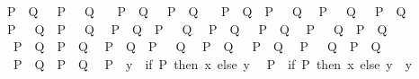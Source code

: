 \begin{isabellebody}
\ \ {\isachardoublequoteopen}P\ {\isacharequal}{\kern0pt}\ Q\ {\isasymor}\ {\isasymnot}\ P\ {\isasymor}\ {\isasymnot}\ Q{\isachardoublequoteclose}\isanewline
\ \ {\isachardoublequoteopen}{\isacharparenleft}{\kern0pt}{\isasymnot}\ P{\isacharparenright}{\kern0pt}\ {\isacharequal}{\kern0pt}\ Q\ {\isasymor}\ {\isasymnot}\ P\ {\isasymor}\ Q{\isachardoublequoteclose}\isanewline
\ \ {\isachardoublequoteopen}{\isacharparenleft}{\kern0pt}{\isasymnot}\ P{\isacharparenright}{\kern0pt}\ {\isacharequal}{\kern0pt}\ Q\ {\isasymor}\ P\ {\isasymor}\ {\isasymnot}\ Q{\isachardoublequoteclose}\isanewline
\ \ {\isachardoublequoteopen}P\ {\isacharequal}{\kern0pt}\ {\isacharparenleft}{\kern0pt}{\isasymnot}\ Q{\isacharparenright}{\kern0pt}\ {\isasymor}\ {\isasymnot}\ P\ {\isasymor}\ Q{\isachardoublequoteclose}\isanewline
\ \ {\isachardoublequoteopen}P\ {\isacharequal}{\kern0pt}\ {\isacharparenleft}{\kern0pt}{\isasymnot}\ Q{\isacharparenright}{\kern0pt}\ {\isasymor}\ P\ {\isasymor}\ {\isasymnot}\ Q{\isachardoublequoteclose}\isanewline
\ \ {\isachardoublequoteopen}P\ {\isasymnoteq}\ Q\ {\isasymor}\ P\ {\isasymor}\ {\isasymnot}\ Q{\isachardoublequoteclose}\isanewline
\ \ {\isachardoublequoteopen}P\ {\isasymnoteq}\ Q\ {\isasymor}\ {\isasymnot}\ P\ {\isasymor}\ Q{\isachardoublequoteclose}\isanewline
\ \ {\isachardoublequoteopen}P\ {\isasymnoteq}\ {\isacharparenleft}{\kern0pt}{\isasymnot}\ Q{\isacharparenright}{\kern0pt}\ {\isasymor}\ P\ {\isasymor}\ Q{\isachardoublequoteclose}\isanewline
\ \ {\isachardoublequoteopen}{\isacharparenleft}{\kern0pt}{\isasymnot}\ P{\isacharparenright}{\kern0pt}\ {\isasymnoteq}\ Q\ {\isasymor}\ P\ {\isasymor}\ Q{\isachardoublequoteclose}\isanewline
\ \ {\isachardoublequoteopen}P\ {\isasymor}\ Q\ {\isasymor}\ P\ {\isasymnoteq}\ {\isacharparenleft}{\kern0pt}{\isasymnot}\ Q{\isacharparenright}{\kern0pt}{\isachardoublequoteclose}\isanewline
\ \ {\isachardoublequoteopen}P\ {\isasymor}\ Q\ {\isasymor}\ {\isacharparenleft}{\kern0pt}{\isasymnot}\ P{\isacharparenright}{\kern0pt}\ {\isasymnoteq}\ Q{\isachardoublequoteclose}\isanewline
\ \ {\isachardoublequoteopen}P\ {\isasymor}\ {\isasymnot}\ Q\ {\isasymor}\ P\ {\isasymnoteq}\ Q{\isachardoublequoteclose}\isanewline
\ \ {\isachardoublequoteopen}{\isasymnot}\ P\ {\isasymor}\ Q\ {\isasymor}\ P\ {\isasymnoteq}\ Q{\isachardoublequoteclose}\isanewline
\ \ {\isachardoublequoteopen}P\ {\isasymor}\ y\ {\isacharequal}{\kern0pt}\ {\isacharparenleft}{\kern0pt}if\ P\ then\ x\ else\ y{\isacharparenright}{\kern0pt}{\isachardoublequoteclose}\isanewline
\ \ {\isachardoublequoteopen}P\ {\isasymor}\ {\isacharparenleft}{\kern0pt}if\ P\ then\ x\ else\ y{\isacharparenright}{\kern0pt}\ {\isacharequal}{\kern0pt}\ y{\isachardoublequoteclose}\isanewline

\end{isabellebody}
